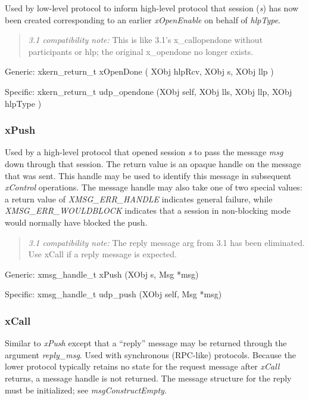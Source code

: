 \noindent Used by low-level protocol to inform high-level
protocol that session ({\em s}) has now been created corresponding to
an earlier {\em xOpenEnable} on behalf of {\em hlpType}.  

\begin{quote}
{\em 3.1 compatibility note:} This is like 3.1's x\_callopendone
without participants or hlp; the original x\_opendone no longer exists.
\end{quote}
\medskip


{\sanss Generic:} {\sem xkern\_return\_t} {\bold xOpenDone} (
{\sem XObj} {\caps hlpRcv}, {\sem XObj} {\caps s}, {\sem XObj} {\caps llp} ) 
\medskip

{\sanss Specific:} {\sem xkern\_return\_t} {\bold udp\_opendone}
({\sem XObj} {\caps self}, {\sem XObj} {\caps lls}, {\sem XObj} {\caps llp}, 
{\sem XObj} {\caps hlpType}
)

\subsubsection{xPush}\label{xPush}

\noindent Used by a high-level protocol that opened session {\em s}
to pass the message {\em msg} down through that session.  The return
value is an opaque handle on the message that was sent.  This handle
may be used to identify this message in subsequent {\em xControl} operations.
The message handle may also take one of two special values:
a return value of {\em XMSG\_ERR\_HANDLE} indicates general failure, 
while {\em XMSG\_ERR\_WOULDBLOCK} indicates that a session in
non-blocking mode would normally have blocked the push.

\begin{quote}
{\em 3.1 compatibility note:} 
The reply message arg from 3.1 has been eliminated.  Use xCall if a
reply message is expected.
\end{quote}
\medskip

{\sanss Generic:} {\sem xmsg\_handle\_t} {\bold xPush} ({\sem XObj} {\caps s}, {\sem Msg} *{\caps msg})
\medskip

{\sanss Specific:} {\sem xmsg\_handle\_t} {\bold udp\_push} ({\sem XObj} {\caps self}, {\sem Msg} *{\caps msg})

\subsubsection{xCall}

\noindent Similar to {\em xPush} except that a ``reply'' message
may be returned through the argument {\em reply\_msg}.  Used with
synchronous (RPC-like) protocols.  Because the lower protocol
typically retains no state for the request message after {\em xCall}
returns, a message handle is not returned.  The message structure for
the reply must be initialized; see {\em msgConstructEmpty}.
\medskip

